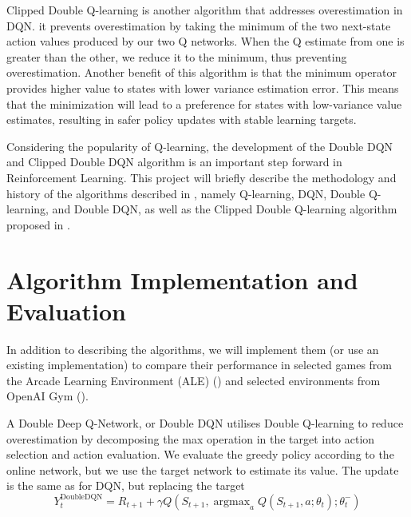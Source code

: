 \documentclass{article}
\DeclareMathOperator*{\argmax}{argmax}
\begin{document}
Clipped Double Q-learning is another algorithm that addresses overestimation in
DQN. it prevents overestimation by taking the minimum of the two next-state
action values produced by our two Q networks.  When the Q estimate from one is
greater than the other, we reduce it to the minimum, thus preventing
overestimation.  Another benefit of this algorithm is that the minimum operator
provides higher value to states with lower variance estimation error.  This
means that the minimization will lead to a preference for states with
low-variance value estimates, resulting in safer policy updates with stable
learning targets.



Considering the popularity of Q-learning, the development of the Double DQN
and Clipped Double DQN algorithm is an important step forward in Reinforcement Learning. 
This project will briefly describe the methodology and history of the algorithms
described in \citet{van2016deep}, namely Q-learning, DQN, Double Q-learning, and
Double DQN, as well as the Clipped Double Q-learning algorithm proposed in
\citet{fujimoto2018addressing}. 


\section{Algorithm Implementation and Evaluation}

In addition to describing the algorithms, we will implement them (or use an
existing implementation) to compare their performance in selected games from the
Arcade Learning Environment (ALE) (\citet{bellemare2013arcade}) and selected
environments from OpenAI Gym (\citet{brockman2016openai}).


A Double Deep Q-Network, or Double DQN utilises Double Q-learning to reduce
overestimation by decomposing the max operation in the target into action
selection and action evaluation. We evaluate the greedy policy according to the
online network, but we use the target network to estimate its value. The update
is the same as for DQN, but replacing the target
\[
    Y_{t}^{\text{DoubleDQN}} = R_{t+1} + \gamma Q(S_{t+1}, \argmax_a Q(S_{t+1},
    a; \theta _{t});\theta _{t}^{-})
\]
\end{document}
